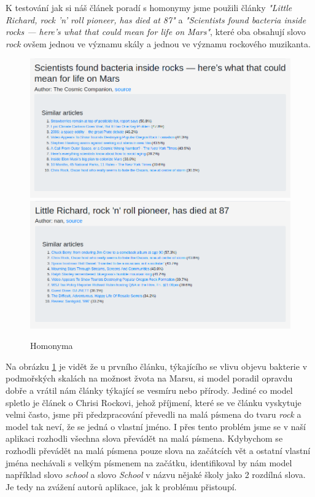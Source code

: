 \documentclass[11pt]{scrartcl} %
\begin{document}
K testování jak si náš článek poradí s homonymy jsme použili články \emph{"Little Richard, rock 'n' roll pioneer, has died at 87"} a \emph{"Scientists found bacteria inside rocks — here’s what that could mean for life on Mars"}, které oba obsahují slovo \emph{rock} ovšem jednou ve významu skály a jednou ve významu rockového muzikanta.

\begin{figure}[h] %
	\centering
	\includegraphics[width=0.7\columnwidth]{images/homonyms_0.png}
	\includegraphics[width=0.7\columnwidth]{images/homonyms_1.png}
	\caption{Homonyma}
	\label{homonyms}
\end{figure}

\bigskip

Na obrázku \ref{homonyms} je vidět že u prvního článku, týkajícího se vlivu objevu bakterie v podmořských skalách na možnost žvota na Marsu, si model poradil opravdu dobře a vrátil nám články týkající se vesmíru nebo přírody. Jediné co model spletlo je článek o Chrisi Rockovi, jehož příjmení, které se ve článku vyskytuje velmi často, jsme při předzpracování převedli na malá písmena do tvaru \emph{rock} a model tak neví, že se jedná o vlastní jméno. I přes tento problém jsme se v naší aplikaci rozhodli všechna slova převádět na malá písmena. Kdybychom se rozhodli převádět na malá písmena pouze slova na začátcích vět a ostatní vlastní jména nechávali s velkým písmenem na začátku, identifikoval by nám model například slovo \emph{school} a slovo \emph{School} v názvu nějaké školy jako 2 rozdílná slova. Je tedy na zvážení autorů aplikace, jak k problému přistoupí.
\end{document}
